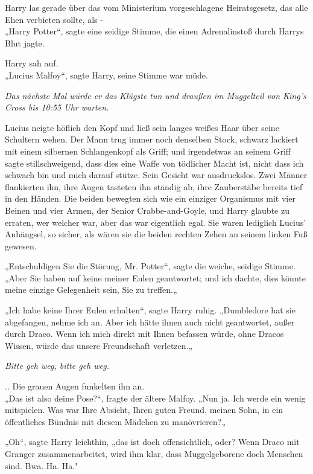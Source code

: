 {Harry las gerade über das vom Ministerium vorgeschlagene Heiratsgesetz, das alle Ehen verbieten sollte, als -\\ „Harry Potter“, sagte eine seidige Stimme, die einen Adrenalinstoß durch Harrys Blut jagte.

Harry sah auf.\\ „Lucius Malfoy“, sagte Harry, seine Stimme war müde.

\emph{Das nächste Mal würde er das Klügste tun und draußen im Muggelteil von King's Cross bis 10:55 Uhr warten.}

Lucius neigte höflich den Kopf und ließ sein langes weißes Haar über seine Schultern wehen. Der Mann trug immer noch denselben Stock, schwarz lackiert mit einem silbernen Schlangenkopf als Griff; und irgendetwas an seinem Griff sagte stillschweigend, dass dies eine Waffe von tödlicher Macht ist, nicht dass ich schwach bin und mich darauf stütze. Sein Gesicht war ausdruckslos. Zwei Männer flankierten ihn, ihre Augen tasteten ihn ständig ab, ihre Zauberstäbe bereits tief in den Händen. Die beiden bewegten sich wie ein einziger Organismus mit vier Beinen und vier Armen, der Senior Crabbe-and-Goyle, und Harry glaubte zu erraten, wer welcher war, aber das war eigentlich egal. Sie waren lediglich Lucius' Anhängsel, so sicher, als wären sie die beiden rechten Zehen an seinem linken Fuß gewesen.

„Entschuldigen Sie die Störung, Mr. Potter“, sagte die weiche, seidige Stimme.\\ „Aber Sie haben auf keine meiner Eulen geantwortet; und ich dachte, dies könnte meine einzige Gelegenheit sein, Sie zu treffen.„

„Ich habe keine Ihrer Eulen erhalten“, sagte Harry ruhig. „Dumbledore hat sie abgefangen, nehme ich an. Aber ich hätte ihnen auch nicht geantwortet, außer durch Draco. Wenn ich mich direkt mit Ihnen befassen würde, ohne Dracos Wissen, würde das unsere Freundschaft verletzen.„

\emph{Bitte geh weg, bitte geh weg.}

.. Die grauen Augen funkelten ihn an.\\ „Das ist also deine Pose?“, fragte der ältere Malfoy. „Nun ja. Ich werde ein wenig mitspielen. Was war Ihre Absicht, Ihren guten Freund, meinen Sohn, in ein öffentliches Bündnis mit diesem Mädchen zu manövrieren?„

„Oh“, sagte Harry leichthin, „das ist doch offensichtlich, oder? Wenn Draco mit Granger zusammenarbeitet, wird ihm klar, dass Muggelgeborene doch Menschen sind. Bwa. Ha. Ha."

}
